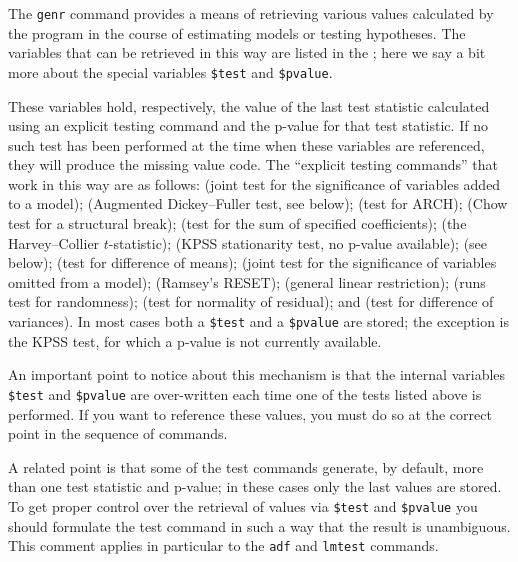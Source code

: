 The \verb+genr+ command provides a means of retrieving various values
calculated by the program in the course of estimating models or
testing hypotheses.  The variables that can be retrieved in this way
are listed in the \GCR; here we say a bit more about the special
variables \verb+$test+ and \verb+$pvalue+.

These variables hold, respectively, the value of the last test
statistic calculated using an explicit testing command and the p-value
for that test statistic.  If no such test has been performed at the
time when these variables are referenced, they will produce the
missing value code.  The ``explicit testing commands'' that work in
this way are as follows:  (joint test for the significance of
variables added to a model);  (Augmented Dickey--Fuller test,
see below);  (test for ARCH);  (Chow test for a
structural break);  (test for the sum of specified
coefficients);  (the Harvey--Collier $t$-statistic);
 (KPSS stationarity test, no p-value available);
 (see below);  (test for difference of
means);  (joint test for the significance of variables
omitted from a model);  (Ramsey's RESET); 
(general linear restriction);  (runs test for randomness);
 (test for normality of residual); and 
(test for difference of variances). In most cases both a \verb+$test+
and a \verb+$pvalue+ are stored; the exception is the KPSS test, for
which a p-value is not currently available.
    
An important point to notice about this mechanism is that the internal
variables \verb+$test+ and \verb+$pvalue+ are over-written each time
one of the tests listed above is performed.  If you want to reference
these values, you must do so at the correct point in the sequence of
 commands.  

A related point is that some of the test commands generate, by
default, more than one test statistic and p-value; in these cases only
the last values are stored. To get proper control over the retrieval
of values via \verb+$test+ and \verb+$pvalue+ you should formulate the
test command in such a way that the result is unambiguous.  This
comment applies in particular to the \verb+adf+ and \verb+lmtest+
commands.

